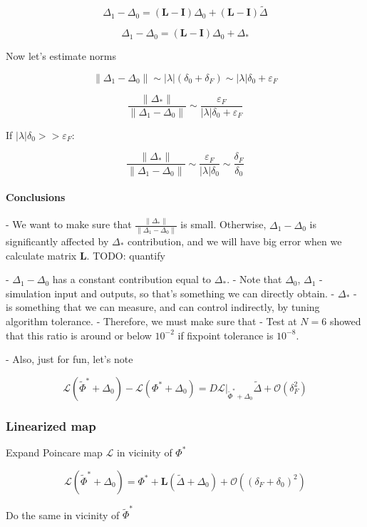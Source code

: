 \documentclass[a4paper,10pt]{article}
\newcommand*{\wt}{\widetilde} %
\newcommand*{\FP}{\Phi^*}%
\newcommand*{\D}{\Delta}%
\begin{document}
\begin{appendices}
$$
\D_1 - \D_0
=  (\mathbf{L} - \mathbf{I})  \D_0  + (\mathbf{L} - \mathbf{I}) \wt \D
$$

$$
\D_1 - \D_0
=  (\mathbf{L} - \mathbf{I})  \D_0  + \D_*
$$

Now let's estimate norms

$$
\lVert \D_1 - \D_0 \rVert
\sim
|\lambda|(\delta_0 + \delta_F)
\sim
|\lambda|\delta_0 + \varepsilon_F
$$

$$
\frac{ \lVert \D_* \rVert }  {\lVert \D_1 - \D_0 \rVert }
\sim
\frac{ \varepsilon_F } { |\lambda| \delta_0 + \varepsilon_F}
$$

If $|\lambda| \delta_0 >>  \varepsilon_{F}:$

$$
\frac{ \lVert \D_* \rVert }  {\lVert \D_1 - \D_0 \rVert }
\sim
\frac{ \varepsilon_F } { |\lambda| \delta_0}
\sim
\frac{ \delta_F } {  \delta_0 }
$$


\paragraph*{Conclusions}
- We want to make sure that $\frac{ \lVert \D_* \rVert }  {\lVert \D_1 - \D_0 \rVert } $ is small. Otherwise, $\D_1 - \D_0$ is significantly affected by $\D_*$ contribution, and we will have big error when we calculate matrix $\mathbf{L}$. TODO: quantify

- $\D_1 - \D_0$ has a constant contribution equal to $\D_*$.
- Note that $\D_0$, $\D_1$ - simulation input and outputs, so that's something we can directly obtain.
- $ \D_* $ - is something that we can measure, and can control indirectly, by tuning
  algorithm tolerance.
- Therefore, we must make sure that
  - Test at $N=6$ showed that this ratio is around or below $10^{-2}$ if fixpoint tolerance is $10^{-8}$.

- Also, just for fun, let's note

$$
 \mathcal{L}(\wt \FP  + \D_0) - \mathcal{L}( \FP  + \D_0) = D\mathcal{L} \vert_{\wt \FP  + \D_0} \wt \D + \mathcal{O}(\delta_F^2)
$$


\subsubsection{Linearized map}
Expand Poincare map $\mathcal{L}$ in vicinity of $\FP$

$$
\mathcal{L}(\wt \FP+ \D_0)
= \FP +  \mathbf{L}  ( \wt \D +  \D_0 ) + \mathcal{O}(( \delta_F + \delta_0)^2)
$$ %

Do the same in vicinity of $\wt \FP$


\end{appendices}
\end{document}
